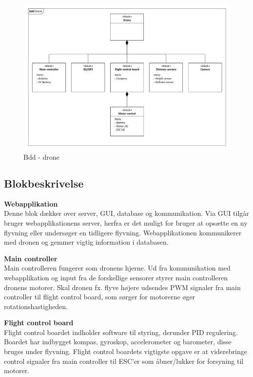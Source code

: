\begin{figure}[H]
\centering
\includegraphics[width=1\textwidth]{Billeder/BDD/bdd_drone.pdf}
\caption{Bdd - drone}
\label{fig:bdd_drone}
\end{figure}

\newpage

\subsection{Blokbeskrivelse}

\textbf{Webapplikation}\\
Denne blok dækker over server, GUI, database og kommunikation. Via GUI tilgår bruger webapplikationens server, herfra er det muligt for bruger at opsætte en ny flyvning eller undersøger en tidligere flyvning. Webapplikationen kommunikerer med dronen og gemmer vigtig information i databasen.

\textbf{Main controller}\\
Main controlleren fungerer som dronens hjerne. Ud fra kommunikation med webapplikation og input fra de forskellige sensorer styrer main controlleren dronens motorer. Skal dronen fx. flyve højere udsendes PWM signaler fra main controller til flight control board, som sørger for motorerne øger rotationshastigheden. 

\textbf{Flight control board}\\
Flight control boardet indholder software til styring, derunder PID regulering. Boardet har indbygget kompas, gyroskop, accelerometer og barometer, disse bruges under flyvning. Flight control boardets vigtigste opgave er at viderebringe control signaler fra main controller til ESC'er som åbner/lukker for forsyning til motorer. 

